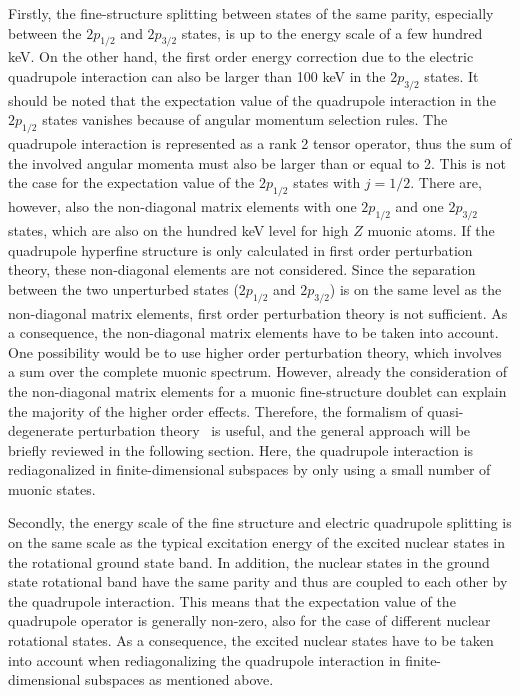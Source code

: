 Firstly, the fine-structure splitting between states of the same parity, especially between the $2p_{1/2}$ and $2p_{3/2}$ states, is up to the energy scale of a few hundred keV. On the other hand, the first order energy correction due to the electric quadrupole interaction can also be larger than 100 keV in the $2p_{3/2}$ states. It should be noted that the expectation value of the quadrupole interaction in the $2p_{1/2}$ states vanishes because of angular momentum selection rules. The quadrupole interaction is represented as a rank 2 tensor operator, thus the sum of the involved angular momenta must also be larger than or equal to 2. This is not the case for the expectation value of the $2p_{1/2}$ states with $j=1/2$. There are, however, also the non-diagonal matrix elements with one $2p_{1/2}$ and one $2p_{3/2}$ states, which are also on the hundred keV level for high $Z$ muonic atoms. If the quadrupole hyperfine structure is only calculated in first order perturbation theory, these non-diagonal elements are not considered. Since the separation between the two unperturbed states ($2p_{1/2}$ and $2p_{3/2}$) is on the same level as the non-diagonal matrix elements, first order perturbation theory is not sufficient. As a consequence, the non-diagonal matrix elements have to be taken into account. One possibility would be to use higher order perturbation theory, which involves a sum over the complete muonic spectrum. However, already the consideration of the non-diagonal matrix elements for a muonic fine-structure doublet can explain the majority of the higher order effects. Therefore, the formalism of quasi-degenerate perturbation theory~\cite{sakurai1994} is useful, and the general approach will be briefly reviewed in the following section. Here, the quadrupole interaction is rediagonalized in finite-dimensional subspaces by only using a small number of muonic states.

Secondly, the energy scale of the fine structure and electric quadrupole splitting is on the same scale as the typical excitation energy of the excited nuclear states in the rotational ground state band. In addition, the nuclear states in the ground state rotational band have the same parity and thus are coupled to each other by the quadrupole interaction. This means that the expectation value of the quadrupole operator is generally non-zero, also for the case of different nuclear rotational states. As a consequence, the excited nuclear states have to be taken into account when rediagonalizing the quadrupole interaction in finite-dimensional subspaces as mentioned above.

